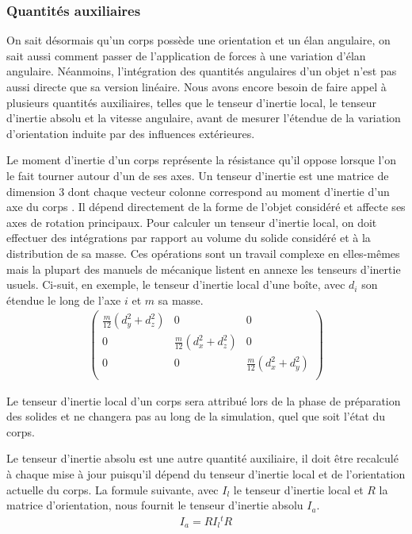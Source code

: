 \subsubsection{Quantités auxiliaires}

On sait désormais qu'un corps possède une orientation et un élan
angulaire, on sait aussi comment passer de l'application de forces à
une variation d'élan angulaire. Néanmoins, l'intégration des quantités
angulaires d'un objet n'est pas aussi directe que sa version
linéaire. Nous avons encore besoin de faire appel à plusieurs
quantités auxiliaires, telles que le tenseur d'inertie local, le
tenseur d'inertie absolu et la vitesse angulaire, avant de mesurer
l'étendue de la variation d'orientation induite par des influences
extérieures.

Le moment d'inertie d'un corps représente la résistance qu'il oppose
lorsque l'on le fait tourner autour d'un de ses axes. Un tenseur
d'inertie est une matrice de dimension 3 dont chaque vecteur colonne
correspond au moment d'inertie d'un axe du corps \cite{eberly}. Il
dépend directement de la forme de l'objet considéré et affecte ses
axes de rotation principaux. Pour calculer un tenseur d'inertie local,
on doit effectuer des intégrations par rapport au volume du solide
considéré et à la distribution de sa masse. Ces opérations sont un
travail complexe en elles-mêmes mais la plupart des manuels de
mécanique listent en annexe les tenseurs d'inertie usuels. Ci-suit, en
exemple, le tenseur d'inertie local d'une boîte, avec $d_i$ son
étendue le long de l'axe $i$ et $m$ sa masse.
\begin{align*}
  \begin{pmatrix}
    \frac{m}{12}(d_y^2 + d_z^2) & 0 & 0 \\
    0 & \frac{m}{12}(d_x^2 + d_z^2) & 0 \\
    0 & 0 & \frac{m}{12}(d_x^2 + d_y^2) \\
  \end{pmatrix}
\end{align*}

Le tenseur d'inertie local d'un corps sera attribué lors de la phase
de préparation des solides et ne changera pas au long de la
simulation, quel que soit l'état du corps.

Le tenseur d'inertie absolu est une autre quantité auxiliaire, il doit
être recalculé à chaque mise à jour puisqu'il dépend du tenseur
d'inertie local et de l'orientation actuelle du corps. La formule
suivante, avec $I_l$ le tenseur d'inertie local et $R$ la matrice
d'orientation, nous fournit le tenseur d'inertie absolu $I_{a}$.
\begin{align*}
  I_a = R I_l {}^t\!\!R
\end{align*}

